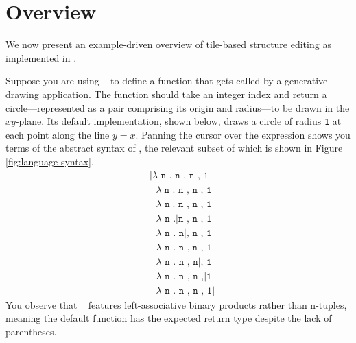 \section{Overview}\label{sec:overview}





We now present an example-driven overview of tile-based
structure editing as implemented in \tylr.

Suppose you are using \tylr~ to define a function that gets called by a
generative drawing application.
The function should take an integer index and
return a circle---represented as a pair comprising
its origin and radius---to be drawn in the $xy$-plane.
Its default implementation, shown below, draws a circle
of radius \texttt{1} at each point along the line $y = x$.
Panning the cursor over the expression shows you terms of
the abstract syntax of \tylr, the relevant subset of which
is shown in Figure \ref{fig:language-syntax}.
\begin{align*}
  & \texttt{|$\lambda$ n . n , n , 1} \\
  & \texttt{\ $\lambda$|n . n , n , 1} \\
  & \texttt{\ $\lambda$ n|. n , n , 1} \\
  & \texttt{\ $\lambda$ n .|n , n , 1} \\
  & \texttt{\ $\lambda$ n . n|, n , 1} \\
  & \texttt{\ $\lambda$ n . n ,|n , 1} \\
  & \texttt{\ $\lambda$ n . n , n|, 1} \\
  & \texttt{\ $\lambda$ n . n , n ,|1} \\
  & \texttt{\ $\lambda$ n . n , n , 1|}
\end{align*}
You observe that \tylr~ features left-associative binary
products rather than n-tuples, meaning the default function
has the expected return type despite the lack of parentheses.

